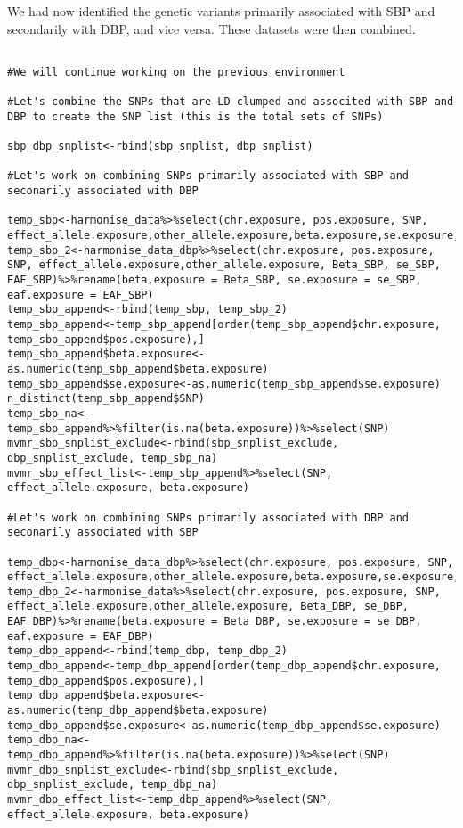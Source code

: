 \documentclass[11pt]{article}
\begin{document}
We had now identified the genetic variants primarily associated with SBP and secondarily with DBP, and vice versa. These datasets were then combined.
\begin{lstlisting}[style=Rstyle]

#We will continue working on the previous environment 

#Let's combine the SNPs that are LD clumped and associted with SBP and DBP to create the SNP list (this is the total sets of SNPs)

sbp_dbp_snplist<-rbind(sbp_snplist, dbp_snplist)

#Let's work on combining SNPs primarily associated with SBP and seconarily associated with DBP

temp_sbp<-harmonise_data%>%select(chr.exposure, pos.exposure, SNP, effect_allele.exposure,other_allele.exposure,beta.exposure,se.exposure,eaf.exposure)
temp_sbp_2<-harmonise_data_dbp%>%select(chr.exposure, pos.exposure, SNP, effect_allele.exposure,other_allele.exposure, Beta_SBP, se_SBP, EAF_SBP)%>%rename(beta.exposure = Beta_SBP, se.exposure = se_SBP, eaf.exposure = EAF_SBP)
temp_sbp_append<-rbind(temp_sbp, temp_sbp_2)
temp_sbp_append<-temp_sbp_append[order(temp_sbp_append$chr.exposure, temp_sbp_append$pos.exposure),]
temp_sbp_append$beta.exposure<-as.numeric(temp_sbp_append$beta.exposure)
temp_sbp_append$se.exposure<-as.numeric(temp_sbp_append$se.exposure)
n_distinct(temp_sbp_append$SNP)
temp_sbp_na<-temp_sbp_append%>%filter(is.na(beta.exposure))%>%select(SNP)
mvmr_sbp_snplist_exclude<-rbind(sbp_snplist_exclude, dbp_snplist_exclude, temp_sbp_na)
mvmr_sbp_effect_list<-temp_sbp_append%>%select(SNP, effect_allele.exposure, beta.exposure)

#Let's work on combining SNPs primarily associated with DBP and seconarily associated with SBP

temp_dbp<-harmonise_data_dbp%>%select(chr.exposure, pos.exposure, SNP, effect_allele.exposure,other_allele.exposure,beta.exposure,se.exposure,eaf.exposure)
temp_dbp_2<-harmonise_data%>%select(chr.exposure, pos.exposure, SNP, effect_allele.exposure,other_allele.exposure, Beta_DBP, se_DBP, EAF_DBP)%>%rename(beta.exposure = Beta_DBP, se.exposure = se_DBP, eaf.exposure = EAF_DBP)
temp_dbp_append<-rbind(temp_dbp, temp_dbp_2)
temp_dbp_append<-temp_dbp_append[order(temp_dbp_append$chr.exposure, temp_dbp_append$pos.exposure),]
temp_dbp_append$beta.exposure<-as.numeric(temp_dbp_append$beta.exposure)
temp_dbp_append$se.exposure<-as.numeric(temp_dbp_append$se.exposure)
temp_dbp_na<-temp_dbp_append%>%filter(is.na(beta.exposure))%>%select(SNP)
mvmr_dbp_snplist_exclude<-rbind(sbp_snplist_exclude, dbp_snplist_exclude, temp_dbp_na)
mvmr_dbp_effect_list<-temp_dbp_append%>%select(SNP, effect_allele.exposure, beta.exposure)


\end{lstlisting}
\end{document}
